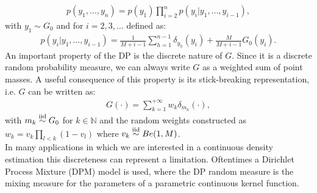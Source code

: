 \begin{align}
	p(y_1,\dots,y_n)= p(y_1)\prod\limits_{i=2}^{n} p(y_i|y_1,\dots,y_{i-1}),
\end{align}
with $y_1 \sim G_0$ and for $i=2,3,\dots$ defined as:
\begin{align}
	p(y_i|y_1,\dots,y_{i-1})= \frac{1}{M+i-1}\sum_{h=1}^{n-1} \delta_{y_h}(y_i) +\frac{M}{M+i-1} G_0(y_i).
\end{align}
An important property of the DP is the discrete nature of $G$. Since it is a discrete
random probability measure, we can always write $G$ as a weighted sum of point masses.
A useful consequence of this property is its stick-breaking representation, i.e. $G$ can be written as:
\begin{align}
	G(\cdot) = \sum_{k=1}^{+\infty} w_k \delta_{m_k} (\cdot),
\end{align}
with $m_k \stackrel{\text{iid}}{\sim} G_0$ for $k\in\mathbb{N}$ and the random weights constructed as $w_k =v_k\prod\limits_{l<k} (1-v_l)$ where $v_k \stackrel{\text{iid}}{\sim} Be(1,M)$. \\
In many applications in which we are interested in a continuous density estimation this discreteness can represent a limitation.
Oftentimes a Dirichlet Process Mixture (DPM) model is used, where the DP random measure is the mixing measure for the parameters of a parametric continuous kernel function.

